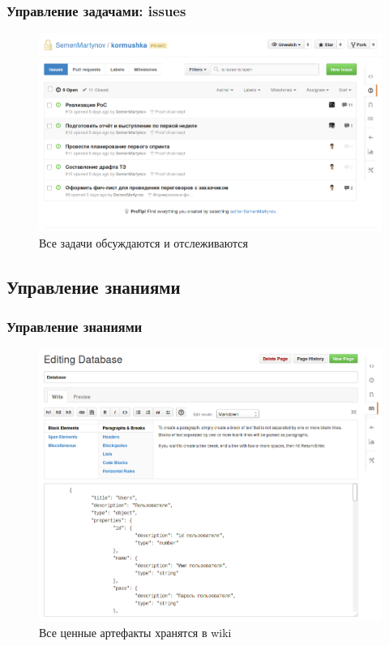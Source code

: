 \documentclass{beamer}
\begin{document}

\begin{frame}
\frametitle{Управление задачами: issues}

\begin{figure}
\includegraphics[scale=0.30]{res/r1_issues}
\caption{Все задачи обсуждаются и отслеживаются}
\end{figure}

\end{frame}



\subsection{Управление знаниями}

\begin{frame}
\frametitle{Управление знаниями}

\begin{figure}
\includegraphics[scale=0.25]{res/r1_wiki}
\caption{Все ценные артефакты хранятся в wiki}
\end{figure}

\end{frame}
\end{document}
